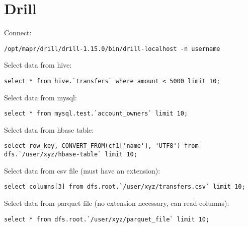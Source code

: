 \documentclass{article}
\begin{document}
\section*{Drill}

Connect:
\begin{lstlisting}[]
/opt/mapr/drill/drill-1.15.0/bin/drill-localhost -n username
\end{lstlisting}

Select data from hive:
\begin{lstlisting}[]
select * from hive.`transfers` where amount < 5000 limit 10;
\end{lstlisting}

Select data from mysql:
\begin{lstlisting}[]
select * from mysql.test.`account_owners` limit 10;
\end{lstlisting}

Select data from hbase table:
\begin{lstlisting}[]
select row_key, CONVERT_FROM(cf1['name'], 'UTF8') from dfs.`/user/xyz/hbase-table` limit 10;
\end{lstlisting}

Select data from csv file (must have an extension):
\begin{lstlisting}[]
select columns[3] from dfs.root.`/user/xyz/transfers.csv` limit 10;
\end{lstlisting}

Select data from parquet file (no extension necessary, can read columns):
\begin{lstlisting}[]
select * from dfs.root.`/user/xyz/parquet_file` limit 10;
\end{lstlisting}
\end{document}
